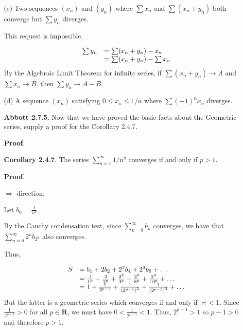\documentclass[10pt]{article}
\begin{document}
(c) Two sequences $\displaystyle ( x_{n})$ and $\displaystyle ( y_{n})$ where $\displaystyle \sum x_{n}$ and $\displaystyle \sum ( x_{n} +y_{n})$ both converge but $\displaystyle \sum y_{n}$ diverges.



This request is impossible.




\begin{equation*}
\begin{array}{ c l }
\sum y_{n} & =\sum ( x_{n} +y_{n}) -x_{n}\\
 & =\sum ( x_{n} +y_{n}) -\sum x_{n}
\end{array}
\end{equation*}
By the Algebraic Limit Theorem for infinite series, if $\displaystyle \sum ( x_{n} +y_{n})\rightarrow A$ and $\displaystyle \sum x_{n}\rightarrow B$, then $\displaystyle \sum y_{n}\rightarrow A-B$.



(d) A sequence $\displaystyle ( x_{n})$ satisfying $\displaystyle 0\leq x_{n} \leq 1/n$ where $\displaystyle \sum ( -1)^{n} x_{n}$ diverges.



\textbf{Abbott 2.7.5}. Now that we have proved the basic facts about the Geometric series, supply a proof for the Corollary 2.4.7.



\textbf{Proof}.



\textbf{Corollary 2.4.7}. The series $\displaystyle \sum _{n=1}^{\infty } 1/n^{p}$ converges if and only if $\displaystyle p >1$.



\textbf{Proof}.



$\displaystyle \Longrightarrow $ direction.



Let $\displaystyle b_{n} =\frac{1}{n^{p}}$.

By the Cauchy condensation test, since $\displaystyle \sum _{n=0}^{\infty } b_{n}$ converges, we have that $\displaystyle \sum _{n=0}^{\infty } 2^{n} b_{2^{n}}$ also converges.

Thus, 


\begin{equation*}
\begin{array}{ c l }
S & =b_{1} +2b_{2} +2^{2} b_{4} +2^{3} b_{8} +\dotsc \\
 & =\frac{1}{1^{p}} +\frac{2}{2^{p}} +\frac{2^{2}}{4^{p}} +\frac{2^{3}}{8^{p}} +\frac{2^{4}}{16^{p}} +\dotsc \\
 & =1+\frac{1}{2^{p-1}} +\frac{1}{\left( 2^{p-1}\right)^{2}} +\frac{1}{\left( 2^{p-1}\right)^{3}} +\dotsc 
\end{array}
\end{equation*}
But the latter is a geometric series which converges if and only if $\displaystyle |r|< 1$. Since $\displaystyle \frac{1}{2^{p-1}}  >0$ for all $\displaystyle p\in \mathbf{R}$, we must have $\displaystyle 0< \frac{1}{2^{p-1}} < 1$. Thus, $\displaystyle 2^{p-1}  >1$ so $\displaystyle p-1 >0$ and therefore $\displaystyle p >1$.
\end{document}
